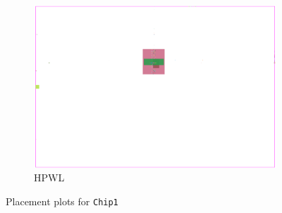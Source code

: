 \begin{figure}[p]
 \bigskip
 
 \begin{subfigure}{.6\textwidth}
  \includegraphics[width=\textwidth]{hpwl_qclique_comparisons/placement_Chip1_HPWL.png}
  \caption{HPWL}
 \end{subfigure}

 \caption{Placement plots for \texttt{Chip1}}
 \label{fig:placement_Chip1_depending_on_objective_function}
\end{figure}

